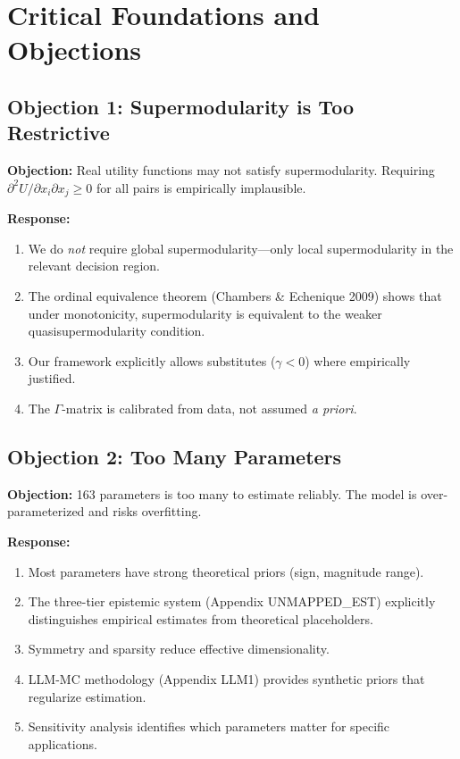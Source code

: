 
\section{Critical Foundations and Objections}
\label{sec:B-foundations-objections}

\subsection{Objection 1: Supermodularity is Too Restrictive}

\textbf{Objection:} Real utility functions may not satisfy supermodularity. 
Requiring $\partial^2 U / \partial x_i \partial x_j \geq 0$ for all pairs 
is empirically implausible.

\textbf{Response:} 
\begin{enumerate}[nosep]
    \item We do \textit{not} require global supermodularity---only local 
    supermodularity in the relevant decision region.
    \item The ordinal equivalence theorem (Chambers \& Echenique 2009) shows 
    that under monotonicity, supermodularity is equivalent to the weaker 
    quasisupermodularity condition.
    \item Our framework explicitly allows substitutes ($\gamma < 0$) where 
    empirically justified.
    \item The $\Gamma$-matrix is calibrated from data, not assumed 
    \textit{a priori}.
\end{enumerate}

\subsection{Objection 2: Too Many Parameters}

\textbf{Objection:} 163 parameters is too many to estimate reliably. The model 
is over-parameterized and risks overfitting.

\textbf{Response:}
\begin{enumerate}[nosep]
    \item Most parameters have strong theoretical priors (sign, magnitude range).
    \item The three-tier epistemic system (Appendix UNMAPPED_EST) explicitly distinguishes 
    empirical estimates from theoretical placeholders.
    \item Symmetry and sparsity reduce effective dimensionality.
    \item LLM-MC methodology (Appendix LLM1) provides synthetic priors that 
    regularize estimation.
    \item Sensitivity analysis identifies which parameters matter for 
    specific applications.
\end{enumerate}

